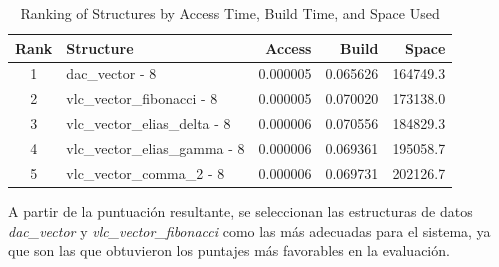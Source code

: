 \begin{table}[h!]
\centering
\caption{Ranking of Structures by Access Time, Build Time, and Space Used}
\label{tab:structure_ranking}
\begin{tabular}{|c|l|r|r|r|}
\hline
\textbf{Rank} & \textbf{Structure} & \textbf{Access} & \textbf{Build} & \textbf{Space} \\
\hline
1 & dac\_vector - 8 & 0.000005 & 0.065626 & 164749.3 \\
\hline
2 & vlc\_vector\_fibonacci - 8 & 0.000005 & 0.070020 & 173138.0 \\
\hline
3 & vlc\_vector\_elias\_delta - 8 & 0.000006 & 0.070556 & 184829.3 \\
\hline
4 & vlc\_vector\_elias\_gamma - 8 & 0.000006 & 0.069361 & 195058.7 \\
\hline
5 & vlc\_vector\_comma\_2 - 8 & 0.000006 & 0.069731 & 202126.7 \\
\hline
\end{tabular}
\end{table}


A partir de la puntuación resultante, se seleccionan las estructuras de datos \textit{dac\_vector} y \textit{vlc\_vector\_fibonacci} como las más adecuadas para el sistema, ya que son las que obtuvieron los puntajes más favorables en la evaluación.